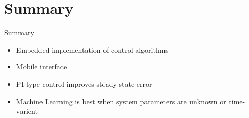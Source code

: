 \documentclass{beamer}
\begin{document}
\section*{Summary}
\begin{frame}{Summary} %
  \begin{itemize}
    \item Embedded implementation of control algorithms
    \item Mobile interface
    \item PI type control improves steady-state error
    \item Machine Learning is best when system parameters are unknown or time-varient
  \end{itemize}
  
\end{frame}
  
\end{document}
